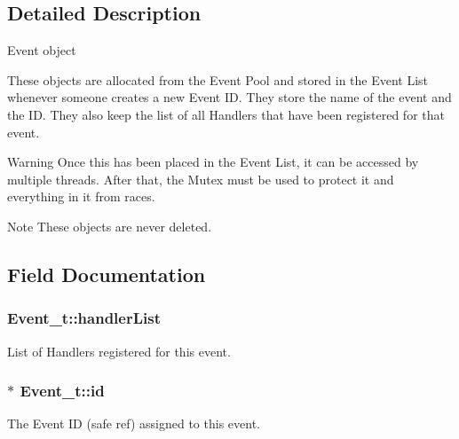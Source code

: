 \subsection{Detailed Description}
Event object

These objects are allocated from the Event Pool and stored in the Event List whenever someone creates a new Event ID. They store the name of the event and the ID. They also keep the list of all Handlers that have been registered for that event.

\begin{DoxyWarning}{Warning}
Once this has been placed in the Event List, it can be accessed by multiple threads. After that, the Mutex must be used to protect it and everything in it from races.
\end{DoxyWarning}
\begin{DoxyNote}{Note}
These objects are never deleted. 
\end{DoxyNote}


\subsection{Field Documentation}
\subsubsection[{\texorpdfstring{handler\+List}{handlerList}}]{ Event\+\_\+t\+::handler\+List}\hypertarget{struct_event__t_a01b2af5e04200a2eefb73ac00287163b}{}\label{struct_event__t_a01b2af5e04200a2eefb73ac00287163b}


List of Handlers registered for this event. 

\subsubsection[{\texorpdfstring{id}{id}}]{$\ast$ Event\+\_\+t\+::id}\hypertarget{struct_event__t_af30e228e32fa2b5dceeae641dcc02a16}{}\label{struct_event__t_af30e228e32fa2b5dceeae641dcc02a16}


The Event ID (safe ref) assigned to this event. 

